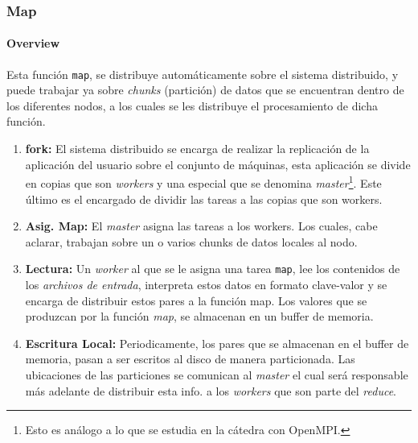 \subsubsection{Map}
\label{sssec:map}

\paragraph{Overview} Esta función {\tt map}, se distribuye automáticamente sobre el sistema
distribuido, y puede trabajar ya sobre {\it chunks} (partición) de datos
que se encuentran dentro de los diferentes nodos, a los cuales se les distribuye el
procesamiento de dicha función. 



\begin{enumerate}
\item {\bf fork:} El sistema distribuido se encarga de realizar la replicación
      de la aplicación del usuario sobre el conjunto de máquinas, esta
      aplicación se divide en copias que son {\it workers} y una especial que
      se denomina {\it master}\footnote{Esto es análogo a lo que se estudia en
      la cátedra con OpenMPI.}. Este último es el encargado de dividir las
      tareas a las copias que son workers.
\item {\bf Asig. Map:} El {\it master} asigna las tareas a los workers. Los
      cuales, cabe aclarar, trabajan sobre un o varios chunks de datos locales al
      nodo.
\item {\bf Lectura:} Un {\it worker} al que se le asigna una tarea {\tt map},
      lee los contenidos de los {\it archivos de entrada}, interpreta estos
      datos en formato clave-valor y se encarga de distribuir estos pares a la
      función {map}. Los valores que se produzcan por la función {\it map}, 
      se almacenan en un buffer de memoria.
\item {\bf Escritura Local:} Periodicamente, los pares que se almacenan en el
      buffer de memoria, pasan a ser escritos al disco de manera particionada. Las 
      ubicaciones de las particiones se comunican al {\it master} el cual será
      responsable más adelante de distribuir esta info. a los {\it workers} que
      son parte del {\it reduce}.
\end{enumerate}
